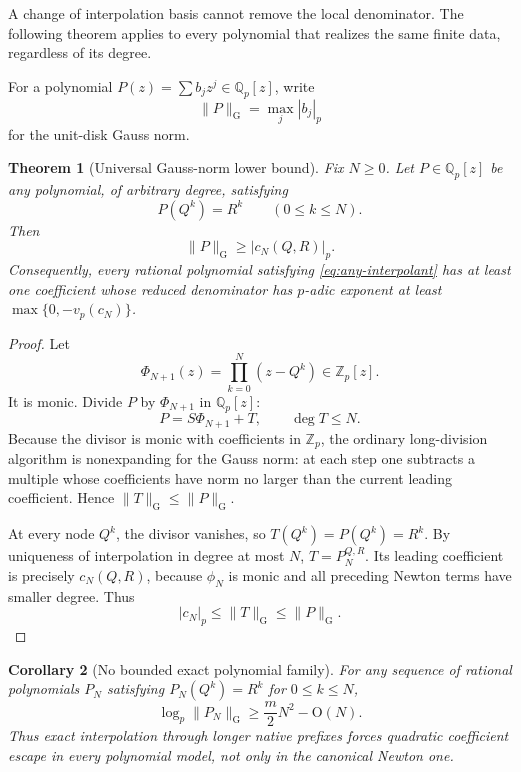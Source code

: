 \documentclass[11pt,oneside]{article}
\newtheorem{theorem}{Theorem}[section]
\newtheorem{corollary}[theorem]{Corollary}
\theoremstyle{definition}
\newcommand{\Z}{\mathbb Z}
\newcommand{\Qp}{\mathbb Q_p}
\newcommand{\vp}{v_p}
\newcommand{\bigO}{\mathrm O}
\begin{document}
A change of interpolation basis cannot remove the local denominator.  The following theorem
applies to every polynomial that realizes the same finite data, regardless of its degree.

For a polynomial $P(z)=\sum b_jz^j\in\Qp[z]$, write
\[
 \lVert P\rVert_{\mathrm G}=\max_j|b_j|_p
\]
for the unit-disk Gauss norm.

\begin{theorem}[Universal Gauss-norm lower bound]\label{thm:universal-gauss}
Fix $N\ge0$.  Let $P\in\Qp[z]$ be any polynomial, of arbitrary degree, satisfying
\begin{equation}\label{eq:any-interpolant}
 P(Q^k)=R^k\qquad(0\le k\le N).
\end{equation}
Then
\begin{equation}\label{eq:gauss-lower}
 \lVert P\rVert_{\mathrm G}
 \ge |c_N(Q,R)|_p.
\end{equation}
Consequently, every rational polynomial satisfying \eqref{eq:any-interpolant} has at least
one coefficient whose reduced denominator has $p$-adic exponent at least
$\max\{0,-\vp(c_N)\}$.
\end{theorem}

\begin{proof}
Let
\[
 \Phi_{N+1}(z)=\prod_{k=0}^{N}(z-Q^k)\in\Z_p[z].
\]
It is monic.  Divide $P$ by $\Phi_{N+1}$ in $\Qp[z]$:
\[
 P=S\Phi_{N+1}+T,
 \qquad \deg T\le N.
\]
Because the divisor is monic with coefficients in $\Z_p$, the ordinary long-division
algorithm is nonexpanding for the Gauss norm: at each step one subtracts a multiple whose
coefficients have norm no larger than the current leading coefficient.  Hence
$\lVert T\rVert_{\mathrm G}\le\lVert P\rVert_{\mathrm G}$.

At every node $Q^k$, the divisor vanishes, so $T(Q^k)=P(Q^k)=R^k$.  By uniqueness of
interpolation in degree at most $N$, $T=P_N^{Q,R}$.  Its leading coefficient is precisely
$c_N(Q,R)$, because $\phi_N$ is monic and all preceding Newton terms have smaller degree.
Thus
\[
 |c_N|_p\le\lVert T\rVert_{\mathrm G}
 \le\lVert P\rVert_{\mathrm G}.
\]
\end{proof}

\begin{corollary}[No bounded exact polynomial family]\label{cor:no-bounded-polys}
For any sequence of rational polynomials $P_N$ satisfying
$P_N(Q^k)=R^k$ for $0\le k\le N$,
\[
 \log_p\lVert P_N\rVert_{\mathrm G}
 \ge \frac m2N^2-\bigO(N).
\]
Thus exact interpolation through longer native prefixes forces quadratic coefficient escape
in every polynomial model, not only in the canonical Newton one.
\end{corollary}
\end{document}
